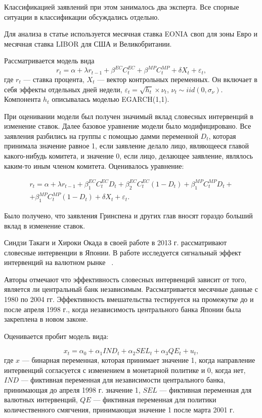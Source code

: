 \documentclass[14pt,a4paper, oneside]{extreport}
\def \a{\alpha}
\def \dt{\delta}
\newcommand{\e}{\varepsilon}
\theoremstyle{plain}              %
\theoremstyle{definition}         %
\begin{document}
Классификацией заявлений при этом занималось два эксперта. Все спорные ситуации в классификации обсуждались отдельно.

Для анализа в статье используется месячная ставка EONIA своп для зоны Евро и месячная ставка LIBOR для США и Великобритании.

Рассматривается модель вида
\begin{equation}
r_t = \a + \lambda r_{t-1} + \beta^{EC} C_t^{EC} + \beta^{MP} C_t^{MP} + \dt X_t + \e_t,
\end{equation} где $r_t$ --- ставка процента, $X_t$ --- вектор контрольных переменных.  Он включает в себя эффекты отдельных дней недели, $\e_t = \sqrt{h_t} \times \nu_t$, $\nu_t \sim iid (0,\sigma_{\nu})$. Компонента $h_t$ описывалась моделью EGARCH(1,1).

При оценивании модели был получен значимый вклад словесных интервенций в изменение ставок.
Далее  базовое уравнение модели было модифицировано. Все заявления разбились на группы с помощью дамми переменной $D_t$, которая принимала значение равное 1, если заявление делало лицо, являющееся главой какого-нибудь комитета, и значение 0, если лицо, делающее заявление, являлось каким-то иным членом комитета. Оценивалось уравнение:

\begin{multline}
r_t = \a + \lambda r_{t-1} + \beta_1^{EC} C_t^{EC} D_t + \beta_2^{EC} C_t^{EC} (1-D_t) + \beta_1^{MP} C_t^{MP} D_t + \\ + \beta_1^{MP} C_t^{MP} (1-D_t) + \dt X_t + \e_t.
\end{multline}


Было получено, что заявления Гринспена и других глав вносят гораздо больший вклад в изменение ставок.  


Синдзи Такаги и Хироки Окада в своей работе в 2013 г. рассматривают словесные интервенции в Японии. В работе исследуется сигнальный эффект интервенций на валютном рынке~
 \cite{takagi2013central}. 

Авторы отмечают что эффективность словесных интервенций зависит от того, является ли центральный банк независимым. Рассматривается месячные данные с 1980 по 2004 гг. Эффективность вмешательства тестируется на промежутке до и после апреля 1998 г., когда независимость центрального банка Японии была закреплена в новом законе. 

Оценивается пробит модель вида:

\begin{equation}
x_t = \a_0 +\a_1 IND_t + \a_2 SEL_t + \a_3 QE_t + u_t, 
\end{equation}где $x$ --- бинарная переменная, которая принимает значение 1, когда направление интервенций согласуется с изменением в монетарной политике и  0, когда нет, $IND$ --- фиктивная переменная для независимости центрального банка, принимающая до апреля 1998 г. значение 1, $SEL$ --- фиктивная переменная для валютных интервенций, $QE$ --- фиктивная переменная для политики количественного смягчения, принимающая значение 1 после марта 2001 г. 
\end{document}
